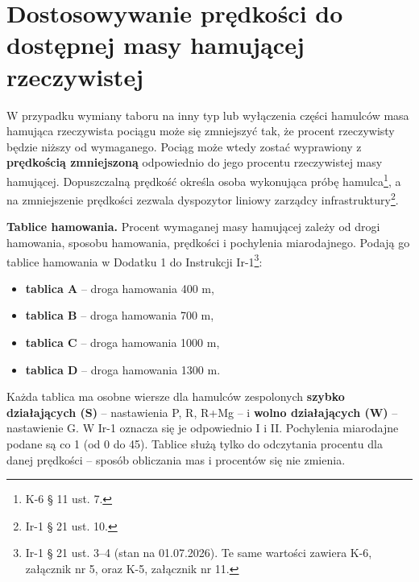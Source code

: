 \section{Dostosowywanie prędkości do dostępnej masy hamującej rzeczywistej}

W przypadku wymiany taboru na inny typ lub wyłączenia części hamulców masa hamująca rzeczywista pociągu może się zmniejszyć tak, że procent rzeczywisty będzie niższy od wymaganego. Pociąg może wtedy zostać wyprawiony z \textbf{prędkością zmniejszoną} odpowiednio do jego procentu rzeczywistej masy hamującej. Dopuszczalną prędkość określa osoba wykonująca próbę hamulca\footnote{K-6 § 11 ust. 7.}, a na zmniejszenie prędkości zezwala dyspozytor liniowy zarządcy infrastruktury\footnote{Ir-1 § 21 ust. 10.}.

\textbf{Tablice hamowania.} Procent wymaganej masy hamującej zależy od drogi hamowania, sposobu hamowania, prędkości i pochylenia miarodajnego. Podają go tablice hamowania w Dodatku 1 do Instrukcji Ir-1\footnote{Ir-1 § 21 ust. 3–4 (stan na 01.07.2026). Te same wartości zawiera K-6, załącznik nr 5, oraz K-5, załącznik nr 11.}:
\begin{itemize}
	\item \textbf{tablica A} – droga hamowania 400 m,
	\item \textbf{tablica B} – droga hamowania 700 m,
	\item \textbf{tablica C} – droga hamowania 1000 m,
	\item \textbf{tablica D} – droga hamowania 1300 m.
\end{itemize}
Każda tablica ma osobne wiersze dla hamulców zespolonych \textbf{szybko działających (S)} – nastawienia P, R, R+Mg – i \textbf{wolno działających (W)} – nastawienie G. W Ir-1 oznacza się je odpowiednio I i II. Pochylenia miarodajne podane są co 1\textperthousand{} (od 0 do 45\textperthousand). Tablice służą tylko do odczytania procentu dla danej prędkości – sposób obliczania mas i procentów się nie zmienia.

